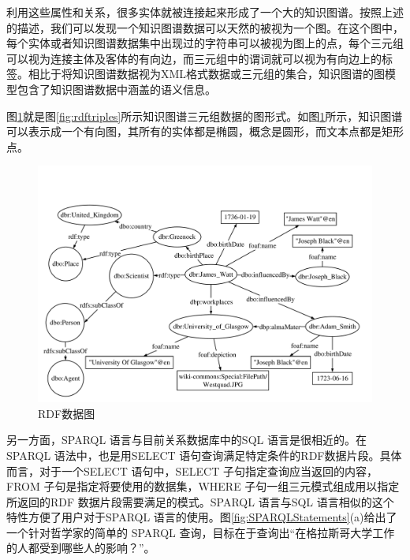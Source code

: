 利用这些属性和关系，很多实体就被连接起来形成了一个大的知识图谱。按照上述的描述，我们可以发现一个知识图谱数据可以天然的被视为一个图。在这个图中，每个实体或者知识图谱数据集中出现过的字符串可以被视为图上的点，每个三元组可以视为连接主体及客体的有向边，而三元组中的谓词就可以视为有向边上的标签。相比于将知识图谱数据视为XML格式数据或三元组的集合，知识图谱的图模型包含了知识图谱数据中涵盖的语义信息。


图\ref{fig:datagraph}就是图\ref{fig:rdftriples}所示知识图谱三元组数据的图形式。如图\ref{fig:datagraph}所示，知识图谱可以表示成一个有向图，其所有的实体都是椭圆，概念是圆形，而文本点都是矩形点。


\begin{figure}
\begin{center}
   \includegraphics[width=12cm]{./figures/part1/data_graph.pdf}
    \caption{RDF数据图}
   \label{fig:datagraph}
\end{center}
\end{figure}

另一方面，SPARQL 语言与目前关系数据库中的SQL 语言是很相近的。在SPARQL 语法中，也是用SELECT 语句查询满足特定条件的RDF数据片段。具体而言，对于一个SELECT 语句中，SELECT 子句指定查询应当返回的内容，FROM 子句是指定将要使用的数据集，WHERE 子句一组三元模式组成用以指定所返回的RDF 数据片段需要满足的模式。SPARQL 语言与SQL 语言相似的这个特性方便了用户对于SPARQL 语言的使用。图\ref{fig:SPARQLStatements}(a)给出了一个针对哲学家的简单的 SPARQL 查询，目标在于查询出``在格拉斯哥大学工作的人都受到哪些人的影响？''。


